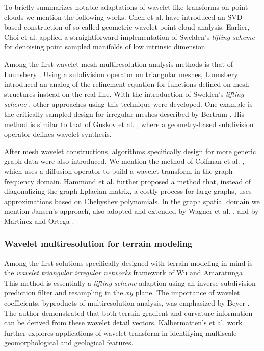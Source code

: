 \documentclass[graybox]{svmult}
\begin{document}
To briefly summarizes notable adaptations of wavelet-like transforms on point clouds we mention the following works. Chen et al. \cite{Chen2010} have introduced an SVD-based construction of so-called geometric wavelet point cloud analysis. Earlier, Choi et al. \cite{Choi2005} applied a straightforward implementation of Swelden's \emph{lifting scheme} \cite{Sweldens1996} for denoising point sampled manifolds of low intrinsic dimension.

Among the first wavelet mesh multiresolution analysis methods is that of Lounsbery \cite{Lounsbery1994}. Using a subdivision operator on triangular meshes, Lounsbery introduced an analog of the refinement equation for functions defined on mesh structures instead on the real line. With the introduction of Swelden's \emph{lifting scheme} \cite{Sweldens1996}, other approaches using this technique were developed. One example is the critically sampled design for irregular meshes described by Bertram \cite{Bertram2007}. His method is similar to that of Guskov et al. \cite{Guskov1999}, where a geometry-based subdivision operator defines wavelet synthesis.

After mesh wavelet constructions, algorithms specifically design for more generic graph data were also introduced. We mention the method of Coifman et al. \cite{Coifman2006}, which uses a diffusion operator to build a wavelet transform in the graph frequency domain. Hammond et al. \cite{Hammond2011} further proposed a method that, instead of diagonalizing the graph Lplacian matrix, a costly process for large graphs, uses approximations based on Chebyshev polynomials. In the graph spatial domain we mention Jansen's \cite{Jansen2001, Jansen2013} approach, also adopted and extended by Wagner et al. \cite{Wagner2005}, and by Martinez and Ortega \cite{Martinez2011}.

\subsubsection{Wavelet multiresolution for terrain modeling}
Among the first solutions specifically designed with terrain modeling in mind is the \emph{wavelet triangular irregular networks} framework of Wu and Amaratunga \cite{WuA03}. This method is essentially a \emph{lifting scheme} adaption using an inverse subdivision prediction filter and resampling in the $xy$ plane. The importance of wavelet coefficients, byproducts of multiresolution analysis, was emphasized by Beyer \cite{Beyer2003}. The author demonstrated that both terrain gradient and curvature information can be derived from these wavelet detail vectors. Kalbermatten's et al. \cite{Kalbermatten2012} work further explores applications of wavelet transform in identifying multiscale geomorphological and geological features.
\end{document}
